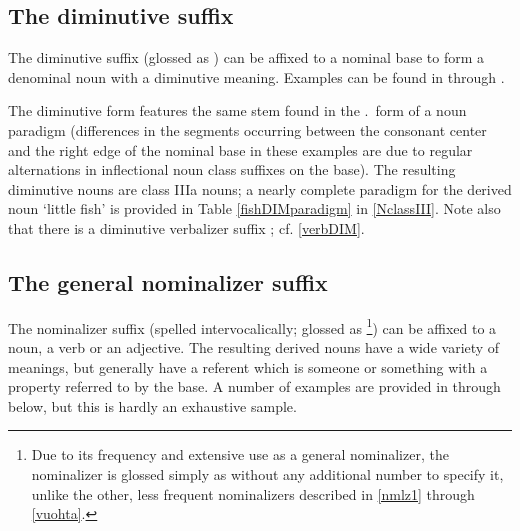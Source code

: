\subsection{The diminutive suffix }\label{dim}
The diminutive suffix  (glossed as ) can be affixed to a nominal base to form a denominal noun with a diminutive meaning. Examples can be found in  through . 
\ea\label{DIMex1}
\z
\ea\label{DIMex2}
\z
\ea\label{DIMex3}
\z
\ea\label{DIMex4}
\z
\ea\label{DIMex5}
\z
\ea\label{DIMex6}
\z

The diminutive form features the same stem found in the \NOMs.\PLs\ form of a noun paradigm (differences in the segments occurring between the consonant center and the right edge of the nominal base in these examples are due to regular alternations in inflectional noun class suffixes on the base). %
The resulting diminutive nouns are class IIIa nouns; a nearly complete paradigm for the derived noun  ‘little fish’ is provided in Table \ref{fishDIMparadigm} in \SEC\ref{NclassIII}. %
Note also that there is a diminutive verbalizer suffix ; cf. \SEC\ref{verbDIM}. 


\subsection{The general nominalizer suffix }\label{nmlz2}
The nominalizer suffix  (spelled  intervocalically; glossed as \footnote{Due to its frequency and extensive use as a general nominalizer, the nominalizer  is glossed simply as  without any additional number to specify it, unlike the other, less frequent nominalizers described in \SEC\ref{nmlz1} through \SEC\ref{vuohta}.}) 
can be affixed to a noun, a verb or an adjective. The resulting derived nouns have a wide variety of meanings, but generally have a referent which is someone or something with a property referred to by the base. %
A number of examples are provided in  through  below, but this is hardly an exhaustive sample. %

